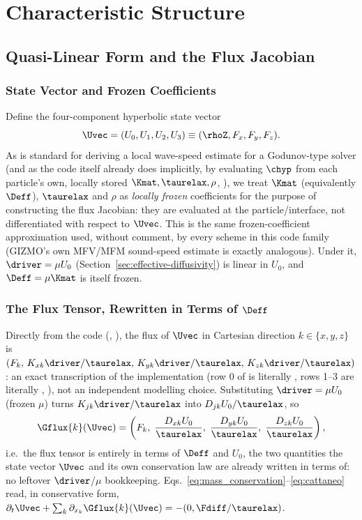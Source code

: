 \section{Characteristic Structure}

\subsection{Quasi-Linear Form and the Flux Jacobian}
\label{sec:quasilinear}

\subsubsection{State Vector and Frozen Coefficients}
Define the four-component hyperbolic state vector
\begin{equation}
  \Uvec = (U_0, U_1, U_2, U_3) \equiv (\rhoZ, F_x, F_y, F_z) .
\end{equation}
As is standard for deriving a local wave-speed estimate for a Godunov-type
solver (and as the code itself already does implicitly, by evaluating
$\chyp$ from each particle's own, locally stored $\Kmat,\taurelax,\rho$,
), we treat $\Kmat$ (equivalently $\Deff$),
$\taurelax$ and $\rho$ as \emph{locally frozen} coefficients for the
purpose of constructing the flux Jacobian: they are evaluated at the
particle/interface, not differentiated with respect to $\Uvec$. This is
the same frozen-coefficient approximation used, without comment, by every
scheme in this code family (GIZMO's own MFV/MFM sound-speed estimate is
exactly analogous). Under it, $\driver=\mu U_0$ (Section~\ref{sec:effective-diffusivity})
is linear in $U_0$, and $\Deff=\mu\Kmat$ is itself frozen.

\subsubsection{The Flux Tensor, Rewritten in Terms of $\Deff$}
Directly from the code (,
), the flux of $\Uvec$ in
Cartesian direction $k\in\{x,y,z\}$ is $(F_k,\,K_{xk}\driver/\taurelax,\,
K_{yk}\driver/\taurelax,\,K_{zk}\driver/\taurelax)$: an exact
transcription of the implementation (row 0 of  is literally
, rows 1--3 are literally ,
), not an independent
modelling choice. Substituting $\driver=\mu U_0$ (frozen $\mu$) turns
$K_{jk}\driver/\taurelax$ into $D_{jk}U_0/\taurelax$, so
\begin{equation}
  \Gflux{k}(\Uvec) = \left( F_k, \; \frac{D_{xk}U_0}{\taurelax}, \; \frac{D_{yk}U_0}{\taurelax}, \; \frac{D_{zk}U_0}{\taurelax} \right) ,
\end{equation}
i.e.\ the flux tensor is entirely in terms of $\Deff$ and $U_0$, the two
quantities the state vector $\Uvec$ and its own conservation law are
already written in terms of: no leftover $\driver$/$\mu$ bookkeeping.
Eqs.~\eqref{eq:mass_conservation}--\eqref{eq:cattaneo} read, in
conservative form, $\partial_t\Uvec + \sum_k \partial_{x_k}\Gflux{k}(\Uvec)
= -(0,\Fdiff/\taurelax)$.

